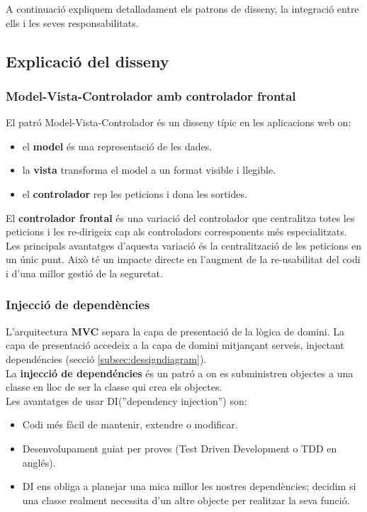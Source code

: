 A continuació expliquem detalladament els patrons de disseny, la integració entre ells i les seves responsabilitats.

\subsection{Explicaci\'{o} del disseny}
\label{subsec:dessignexplanation}

\label{mvcFrontController}
\subsubsection{Model-Vista-Controlador amb controlador frontal}
El patró Model-Vista-Controlador \'{e}s un disseny t\'{i}pic en les aplicacions web on:
\begin{itemize}
\item el \textbf{model} \'{e}s una representaci\'{o} de les dades.
\item la \textbf{vista} transforma el model a un format visible i llegible.
\item el \textbf{controlador} rep les peticions i dona les sortides.
\end{itemize}
El \textbf{controlador frontal} \'{e}s una variació del controlador que centralitza totes les peticions i les re-dirigeix cap als controladors corresponents m\'{e}s especialitzats.\\

Les principals avantatges d'aquesta variació \'{e}s la centralització de les peticions en un únic punt. Això t\'{e} un impacte directe en l'augment de la re-usabilitat del codi i d'una millor gestió de la seguretat.

\subsubsection{Injecció de dependències}
L'arquitectura \textbf{MVC} separa la capa de presentaci\'{o} de la l\`{o}gica de domini. La capa de presentaci\'{o} accedeix a la capa de domini mitjançant serveis, injectant depend\'{e}ncies (secció \ref{subsec:dessigndiagram}).\\

La \textbf{injecci\'{o} de depend\'{e}ncies} \'{e}s un patr\'{o} a on es subministren objectes a una classe en lloc de ser la classe qui crea els objectes.\cite{dependency_injection}\\

Les avantatges de usar DI(''dependency injection'') son:
\begin{itemize}
\item Codi m\'{e}s f\`{a}cil de mantenir, extendre o modificar.
\item Desenvolupament guiat per proves (Test Driven Development o TDD en angl\'{e}s).
\item DI ens obliga a planejar una mica millor les nostres depend\`{e}ncies; decidim si una classe realment necessita d'un altre objecte per realitzar la seva funció.
\end{itemize}

